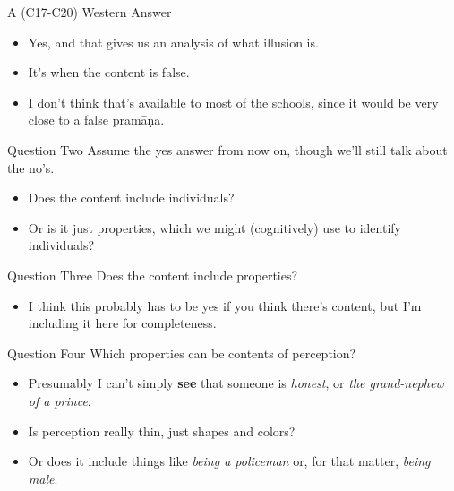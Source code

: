 \documentclass[
  17pt,
  letterpaper,
  ignorenonframetext,
  aspectratio=169,
  handout]{beamer}
\providecommand{\tightlist}{%
  \setlength{\itemsep}{0pt}\setlength{\parskip}{0pt}}\usepackage{longtable,booktabs,array}
\begin{document}
\begin{frame}{A (C17-C20) Western Answer}
\protect\hypertarget{a-c17-c20-western-answer}{}
\begin{itemize}[<+->]
\tightlist
\item
  Yes, and that gives us an analysis of what illusion is.
\item
  It's when the content is false.
\item
  I don't think that's available to most of the schools, since it would
  be very close to a false pramāṇa.
\end{itemize}
\end{frame}

\begin{frame}{Question Two}
\protect\hypertarget{question-two}{}
Assume the yes answer from now on, though we'll still talk about the
no's.

\begin{itemize}[<+->]
\tightlist
\item
  Does the content include individuals?
\item
  Or is it just properties, which we might (cognitively) use to identify
  individuals?
\end{itemize}
\end{frame}

\begin{frame}{Question Three}
\protect\hypertarget{question-three}{}
Does the content include properties?

\begin{itemize}[<+->]
\tightlist
\item
  I think this probably has to be yes if you think there's content, but
  I'm including it here for completeness.
\end{itemize}
\end{frame}

\begin{frame}{Question Four}
\protect\hypertarget{question-four}{}
Which properties can be contents of perception?

\begin{itemize}[<+->]
\tightlist
\item
  Presumably I can't simply \textbf{see} that someone is \emph{honest},
  or \emph{the grand-nephew of a prince}.
\item
  Is perception really thin, just shapes and colors?
\item
  Or does it include things like \emph{being a policeman} or, for that
  matter, \emph{being male}.
\end{itemize}
\end{frame}
\end{document}
